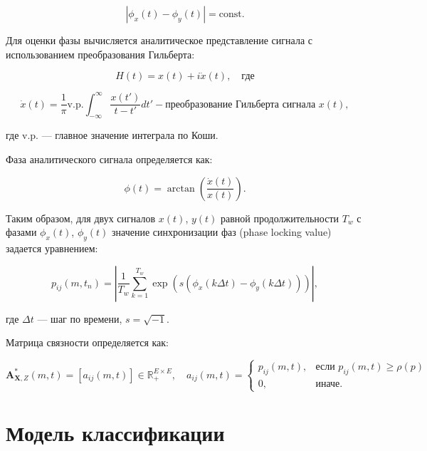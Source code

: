 \documentclass[12pt, twoside]{article}
\begin{document}
\begin{equation}
|\phi_x(t) - \phi_y(t)| = \text{const}.
\end{equation}

Для оценки фазы вычисляется аналитическое представление сигнала с использованием преобразования Гильберта:

\begin{equation}
H(t) = x(t) + i\dot{x}(t), \quad \text{где}
\end{equation}

\begin{equation}
\dot{x}(t) = \frac{1}{\pi} \text{v.p.} \int_{-\infty}^{\infty} \frac{x(t')}{t - t'} dt' - \text{преобразование Гильберта сигнала } x(t),
\end{equation}

\noindent где v.p. — главное значение интеграла по Коши.

Фаза аналитического сигнала определяется как:

\begin{equation}
\phi(t) = \arctan \left( \frac{\dot{x}(t)}{x(t)} \right).
\end{equation}

Таким образом, для двух сигналов $x(t)$, $y(t)$ равной продолжительности $T_w$ с фазами $\phi_x(t)$, $\phi_y(t)$ значение синхронизации фаз (phase locking value) \cite{9} задается уравнением:

\begin{equation}
p_{ij}(m, t_n) = \left| \frac{1}{T_w} \sum_{k=1}^{T_w} \exp \left( s(\phi_x(k \Delta t) - \phi_y(k \Delta t)) \right) \right|,
\end{equation}

\noindent где $\Delta t$ — шаг по времени, $s = \sqrt{-1}$.

Матрица связности определяется как:

\begin{equation}
\mathbf{A}_{\mathbf{X}, Z}^*(m, t) = [a_{ij}(m, t)] \in \mathbb{R}_+^{E \times E}, \quad a_{ij}(m, t) = 
\begin{cases} 
p_{ij}(m, t), & \text{если } p_{ij}(m, t) \geq \rho(p) \\
0, & \text{иначе}.
\end{cases}
\end{equation}



\section{Модель классификации}
\end{document}
